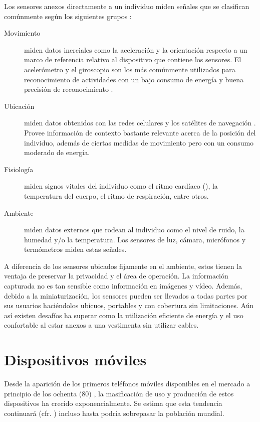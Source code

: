Los sensores anexos directamente a un individuo miden señales que
se clasifican comúnmente según los siguientes grupos \cite{LaraLabrador2013}:
\begin{description}
\item [{Movimiento}] miden datos inerciales como la aceleración y la orientación
respecto a un marco de referencia relativo al dispositivo que contiene
los sensores. El acelerómetro y el giroscopio son los más comúnmente
utilizados para reconocimiento de actividades con un bajo consumo
de energía y buena precisión de reconocimiento \cite{Bao2004,LaraLabrador2012}.
\item [{Ubicación}] miden datos obtenidos con las redes celulares 
y los satélites de navegación . Provee información de contexto
bastante relevante acerca de la posición del individuo, además de
ciertas medidas de movimiento pero con un consumo moderado de energía.
\item [{Fisiología}] miden signos vitales del individuo como el ritmo cardíaco
(), la temperatura del cuerpo, el ritmo de respiración,
entre otros.
\item [{Ambiente}] miden datos externos que rodean al individuo como el
nivel de ruido, la humedad y/o la temperatura. Los sensores de luz,
cámara, micrófonos y termómetros miden estas señales. 
\end{description}
A diferencia de los sensores ubicados fijamente en el ambiente, estos
tienen la ventaja de preservar la privacidad y el área de operación.
La información capturada no es tan sensible como información en imágenes
y vídeo. Además, debido a la miniaturización, los sensores pueden
ser llevados a todas partes por sus usuarios haciéndolos ubicuos,
portables y con cobertura sin limitaciones. Aún así existen desafíos
ha superar como la utilización eficiente de energía y el uso confortable
al estar anexos a una vestimenta sin utilizar cables.

\section{Dispositivos móviles}

\label{sec24:dispositivos-moviles} Desde la aparición de los primeros
teléfonos móviles disponibles en el mercado a principio de los ochenta
(80) \cite{Tanenbaum2010}, la masificación de uso y producción de
estos dispositivos ha crecido exponencialmente. Se estima que esta
tendencia continuará (cfr. \cite{Ekholm2011}) incluso hasta podría
sobrepasar la población mundial.

